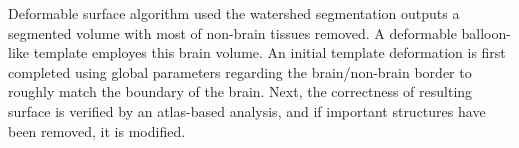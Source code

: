 Deformable surface algorithm used the watershed segmentation outputs a segmented volume with most of non-brain tissues removed. A deformable balloon-like template employes this brain volume. An initial template deformation is first completed using global parameters regarding the brain/non-brain border to roughly match the boundary of the brain. Next, the correctness of resulting surface is verified by an atlas-based analysis, and if important structures have been removed, it is modified.